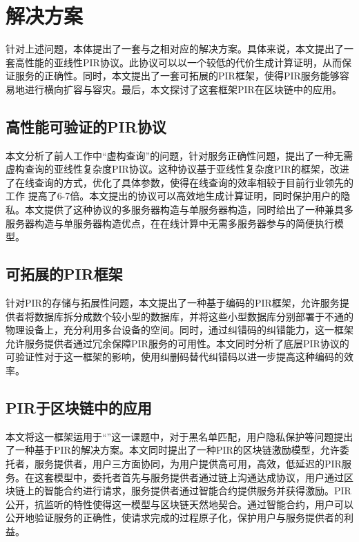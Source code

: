 \section{解决方案}
针对上述问题，本体提出了一套与之相对应的解决方案。具体来说，本文提出了一套高性能的亚线性PIR协议。此协议可以以一个较低的代价生成计算证明，从而保证服务的正确性。同时，本文提出了一套可拓展的PIR框架，使得PIR服务能够容易地进行横向扩容与容灾。最后，本文探讨了这套框架PIR在区块链中的应用。
\subsection{高性能可验证的PIR协议}
本文分析了前人工作中“虚构查询”的问题，针对服务正确性问题，提出了一种无需虚构查询的亚线性复杂度PIR协议。这种协议基于亚线性复杂度PIR的框架，改进了在线查询的方式，优化了具体参数，使得在线查询的效率相较于目前行业领先的工作 \cite{TreePIR,Piano} 提高了6-7倍。本文提出的协议可以高效地生成计算证明，同时保护用户的隐私。本文提供了这种协议的多服务器构造与单服务器构造，同时给出了一种兼具多服务器构造与单服务器构造优点，在在线计算中无需多服务器参与的简便执行模型。
\subsection{可拓展的PIR框架}
针对PIR的存储与拓展性问题，本文提出了一种基于编码的PIR框架，允许服务提供者将数据库拆分成数个较小型的数据库，并将这些小型数据库分别部署于不通的物理设备上，充分利用多台设备的空间。同时，通过纠错码的纠错能力，这一框架允许服务提供者通过冗余保障PIR服务的可用性。本文同时分析了底层PIR协议的可验证性对于这一框架的影响，使用纠删码替代纠错码以进一步提高这种编码的效率。

\subsection{PIR于区块链中的应用}
本文将这一框架运用于“\projectname”这一课题中，对于黑名单匹配，用户隐私保护等问题提出了一种基于PIR的解决方案。本文同时提出了一种PIR的区块链激励模型，允许委托者，服务提供者，用户三方面协同，为用户提供高可用，高效，低延迟的PIR服务。在这套模型中，委托者首先与服务提供者通过链上沟通达成协议，用户通过区块链上的智能合约进行请求，服务提供者通过智能合约提供服务并获得激励。PIR公开，抗监听的特性使得这一模型与区块链天然地契合。通过智能合约，用户可以公开地验证服务的正确性，使请求完成的过程原子化，保护用户与服务提供者的利益。